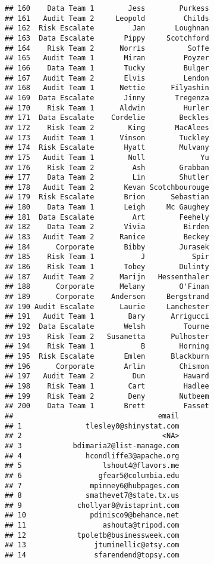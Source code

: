 \documentclass[]{article}
\begin{document}
\begin{verbatim}
## 160    Data Team 1        Jess        Purkess
## 161   Audit Team 2     Leopold         Childs
## 162  Risk Escalate         Jan       Loughnan
## 163  Data Escalate       Pippy     Scotchford
## 164    Risk Team 2      Norris          Soffe
## 165   Audit Team 1       Miran         Poyzer
## 166    Data Team 1       Tucky         Bulger
## 167   Audit Team 2       Elvis         Lendon
## 168   Audit Team 1      Nettie      Filyashin
## 169  Data Escalate       Jinny       Tregenza
## 170    Risk Team 1      Aldwin         Hurler
## 171  Data Escalate    Cordelie        Beckles
## 172    Risk Team 2        King       MacAlees
## 173   Audit Team 1      Vinson        Tuckley
## 174  Risk Escalate       Hyatt        Mulvany
## 175   Audit Team 1        Noll             Yu
## 176    Risk Team 2         Ash        Grabban
## 177    Data Team 2         Lin        Shutler
## 178   Audit Team 2       Kevan Scotchbourouge
## 179  Risk Escalate       Brion      Sebastian
## 180    Data Team 1       Leigh     Mc Gaughey
## 181  Data Escalate         Art        Feehely
## 182    Data Team 2       Vivia         Birden
## 183   Audit Team 2      Ranice         Beckey
## 184      Corporate       Bibby        Jurasek
## 185    Risk Team 1           J           Spir
## 186    Risk Team 1       Tobey        Dulinty
## 187   Audit Team 2      Marijn   Hessenthaler
## 188      Corporate      Melany        O'Finan
## 189      Corporate    Anderson     Bergstrand
## 190 Audit Escalate      Laurie     Lanchester
## 191   Audit Team 1        Bary      Arrigucci
## 192  Data Escalate       Welsh         Tourne
## 193    Risk Team 2   Susanetta      Pulhoster
## 194    Risk Team 1           B        Horning
## 195  Risk Escalate       Emlen      Blackburn
## 196      Corporate       Arlin        Chismon
## 197   Audit Team 2         Dun         Haward
## 198    Risk Team 1        Cart         Hadlee
## 199    Risk Team 2        Deny        Nutbeem
## 200    Data Team 1       Brett         Fasset
##                                  email
## 1               tlesley0@shinystat.com
## 2                                 <NA>
## 3            bdimaria2@list-manage.com
## 4               hcondliffe3@apache.org
## 5                   lshout4@flavors.me
## 6                  gfear5@columbia.edu
## 7                mpinney6@hubpages.com
## 8               smathevet7@state.tx.us
## 9             chollyar8@vistaprint.com
## 10               pdinisco9@behance.net
## 11                  ashouta@tripod.com
## 12            tpoletb@businessweek.com
## 13                jtuminellic@etsy.com
## 14                sfarendend@topsy.com

\end{verbatim}
\end{document}
